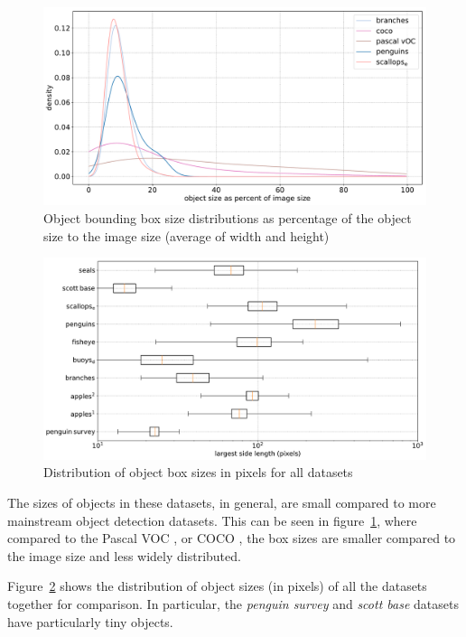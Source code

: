 \begin{figure}[ht]
\centering
\includegraphics[width=1.0\linewidth]{charts/summaries/sizes_density.pdf}
\caption{Object bounding box size distributions as percentage of the object size to the image size (average of width and height) }
\label{fig:box_sizes}
\end{figure}
 

\begin{figure}[ht]
\centering
\includegraphics[width=1.0\linewidth]{charts/summaries/sizes_boxplot.pdf}
\caption{ Distribution of object box sizes in pixels for all datasets }
\label{fig:box_sizes_plot}
\end{figure}

The sizes of objects in these datasets, in general, are small compared to more mainstream object detection datasets. This can be seen in figure~\ref{fig:box_sizes}, where compared to the Pascal VOC \cite{Everingham2008}, or COCO \cite{Lin2014}, the box sizes are smaller compared to the image size and less widely distributed. 

Figure~\ref{fig:box_sizes_plot}  shows the distribution of object sizes (in pixels) of all the datasets together for comparison. In particular, the \emph{penguin survey} and \emph{scott base} datasets have particularly tiny objects.

